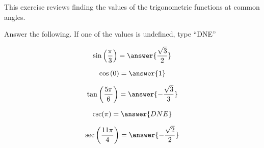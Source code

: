 \documentclass{ximera}
\author{}
\begin{document}
\begin{exercise}
  This exercise reviews finding the values of the trigonometric functions at common angles.  
  
  Answer the following.  If one of the values is undefined, type ``DNE''
  
  \[
\sin \left( \frac{\pi}{3 }\right) = \answer{\frac{\sqrt{3}}{2}}  
  \]

 \[
\cos \left( 0 \right) = \answer{1}  
  \]

 \[
\tan \left(\frac{5\pi}{6}\right) = \answer{-\frac{\sqrt{3}}{3}}
  \]

 \[
\csc(\pi) = \answer{DNE}  
  \]

 \[
\sec \left(\frac{11\pi}{4}\right) = \answer{-\frac{\sqrt{2}}{2}}
  \]

\end{exercise}
\end{document}
